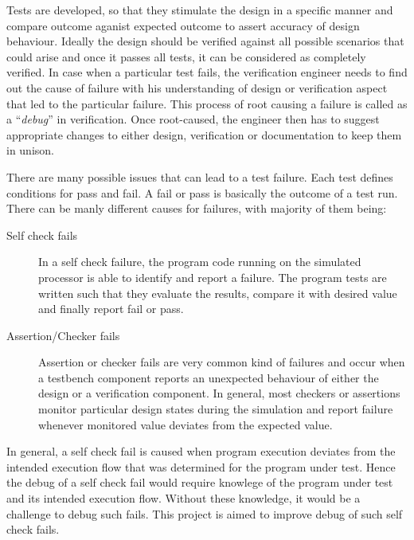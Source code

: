 Tests are developed, so that they stimulate the design in a specific manner and compare outcome aganist expected outcome to assert accuracy of design behaviour. Ideally the design should be verified against all possible scenarios that could arise and once it passes all tests, it can be considered as completely verified. In case when a particular test fails, the verification engineer needs to find out the cause of failure with his understanding of design or verification aspect that led to the particular failure. This process of root causing a failure is called as a ``{\it debug}'' in verification. Once root-caused, the engineer then has to suggest appropriate changes to either design, verification or documentation to keep them in unison. 

There are many possible issues that can lead to a test failure. Each test defines conditions for pass and fail. A fail or pass is basically the outcome of a test run. There can be manly different causes for failures, with majority of them being:

\begin{description}
	\item[Self check fails]  In a self check failure, the program code running on the simulated processor is able to identify and report a failure. The program tests are written such that they evaluate the results, compare it with desired value and finally report fail or pass. 
	\item[Assertion/Checker fails] Assertion or checker fails are very common kind of failures and occur when a testbench component reports an unexpected behaviour of either the design or a verification component. In general, most checkers or assertions monitor particular design states during the simulation and report failure whenever monitored value deviates from the expected value. 
\end{description}

In general, a self check fail is caused when program execution deviates from the intended execution flow that was determined for the program under test. Hence the debug of a self check fail would require knowlege of the program under test and its intended execution flow. Without these knowledge, it would be a challenge to debug such fails. This project is aimed to improve debug of such self check fails.

%
%
%

